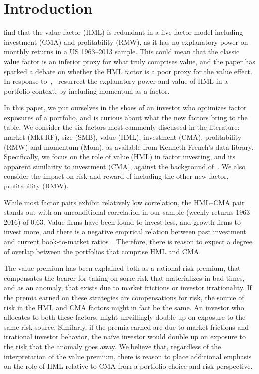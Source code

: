 \section{Introduction}
\textcite{FF2015} find that the value factor (HML) is redundant in a five-factor model including investment (CMA) and profitability (RMW), as it has no explanatory power on monthly returns in a US 1963--2013 sample. This could mean that the classic value factor is an inferior proxy for what truly comprises value, and the paper has sparked a debate on whether the HML factor is a poor proxy for the value effect. In response to~\textcite{FF2015},~\textcite{Asness2015} resurrect the explanatory power and value of HML in a portfolio context, by including momentum as a factor.

In this paper, we put ourselves in the shoes of an investor who optimizes factor exposures of a portfolio, and is curious about what the new factors bring to the table. We consider the six factors most commonly discussed in the literature: market (Mkt.RF), size (SMB), value (HML), investment (CMA), profitability (RMW) and momentum (Mom), as available from Kenneth French's data library. Specifically, we focus on the role of value (HML) in factor investing, and its apparent similarity to investment (CMA), against the background of~\textcite{FF2015,Asness2015}. We also consider the impact on risk and reward of including the other new factor, profitability (RMW).

While most factor pairs exhibit relatively low correlation, the HML--CMA pair stands out with an unconditional correlation in our sample (weekly returns 1963--2016) of 0.63. Value firms have been found to invest less, and growth firms to invest more, and there is a negative empirical relation between past investment and current book-to-market ratios~\autocite{Zhang2005,AndersonGarciaFeijoo2006}. Therefore, there is reason to expect a degree of overlap between the portfolios that comprise HML and CMA.

The value premium has been explained both as a rational risk premium, that compensates the bearer for taking on some risk that materializes in bad times, and as an anomaly, that exists due to market frictions or investor irrationality. If the premia earned on these strategies are compensations for risk, the source of risk in the HML and CMA factors might in fact be the same. An investor who allocates to both these factors, might unwillingly double up on exposure to the same risk source. Similarly, if the premia earned are due to market frictions and irrational investor behavior, the naïve investor would double up on exposure to the risk that the anomaly goes away. We believe that, regardless of the interpretation of the value premium, there is reason to place additional emphasis on the role of HML relative to CMA from a portfolio choice and risk perspective.

